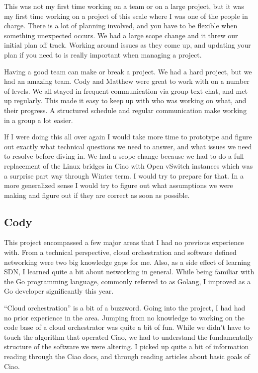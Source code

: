 \documentclass[10pt,onecolumn,journal,draftclsnofoot]{IEEEtran}
\begin{document}
This was not my first time working on a team or on a large project, but it was my first time working on a project of this scale where I was one of the people in charge.
There is a lot of planning involved, and you have to be flexible when something unexpected occurs.
We had a large scope change and it threw our initial plan off track.
Working around issues as they come up, and updating your plan if you need to is really important when managing a project.

Having a good team can make or break a project. 
We had a hard project, but we had an amazing team. 
Cody and Matthew were great to work with on a number of levels.
We all stayed in frequent communication via group text chat, and met up regularly.
This made it easy to keep up with who was working on what, and their progress.
A structured schedule and regular communication make working in a group a lot easier.

If I were doing this all over again I would take more time to prototype and figure out exactly what technical questions we need to answer, and what issues we need to resolve before diving in. We had a scope change because we had to do a full replacement of the Linux bridges in Ciao with Open vSwitch instances which was a surprise part way through Winter term. I would try to prepare for that. In a more generalized sense I would try to figure out what assumptions we were making and figure out if they are correct as soon as possible.


\subsection{Cody}
This project encompassed a few major areas that I had no previous experience with. From a technical perspective, cloud orchestration and software defined networking were two big knowledge gaps for me. Also, as a side effect of learning SDN, I learned quite a bit about networking in general. While being familiar with the Go programming language, commonly referred to as Golang, I improved as a Go developer significantly this year. 

``Cloud orchestration'' is a bit of a buzzword. Going into the project, I had had no prior experience in the area. Jumping from no knowledge to working on the code base of a cloud orchestrator was quite a bit of fun. While we didn't have to touch the algorithm that operated Ciao, we had to understand the fundamentally structure of the software we were altering. I picked up quite a bit of information reading through the Ciao docs, and through reading articles about basic goals of Ciao.
\end{document}
